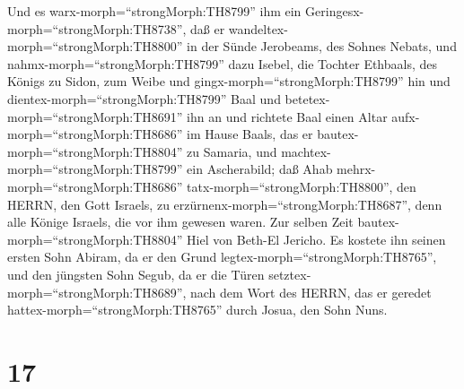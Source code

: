  Und es warx-morph=``strongMorph:TH8799'' ihm ein
Geringesx-morph=``strongMorph:TH8738'', daß er
wandeltex-morph=``strongMorph:TH8800'' in der Sünde Jerobeams, des
Sohnes Nebats, und nahmx-morph=``strongMorph:TH8799'' dazu Isebel, die
Tochter Ethbaals, des Königs zu Sidon, zum Weibe und
gingx-morph=``strongMorph:TH8799'' hin und
dientex-morph=``strongMorph:TH8799'' Baal und
betetex-morph=``strongMorph:TH8691'' ihn an  und richtete
Baal einen Altar aufx-morph=``strongMorph:TH8686'' im Hause Baals, das
er bautex-morph=``strongMorph:TH8804'' zu Samaria,  und
machtex-morph=``strongMorph:TH8799'' ein Ascherabild; daß Ahab
mehrx-morph=``strongMorph:TH8686'' tatx-morph=``strongMorph:TH8800'',
den HERRN, den Gott Israels, zu erzürnenx-morph=``strongMorph:TH8687'',
denn alle Könige Israels, die vor ihm gewesen waren.  Zur
selben Zeit bautex-morph=``strongMorph:TH8804'' Hiel von Beth-El
Jericho. Es kostete ihn seinen ersten Sohn Abiram, da er den Grund
legtex-morph=``strongMorph:TH8765'', und den jüngsten Sohn Segub, da er
die Türen setztex-morph=``strongMorph:TH8689'', nach dem Wort des HERRN,
das er geredet hattex-morph=``strongMorph:TH8765'' durch Josua, den Sohn
Nuns.

\hypertarget{section-16}{%
\section{17}\label{section-16}}

